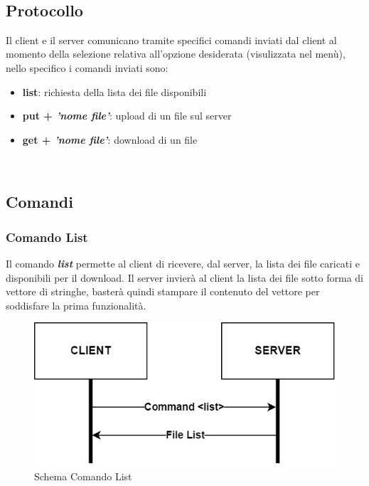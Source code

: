 \documentclass{article}
\begin{document}
\ \\

\subsection{Protocollo}

Il client e il server comunicano tramite specifici comandi inviati dal client al momento della selezione relativa all'opzione desiderata (visulizzata nel menù), nello specifico i comandi inviati sono:
\begin{itemize}
    \item \textbf{list}: richiesta della lista dei file disponibili
    \item \textbf{put + \textit{'nome file'}}: upload di un file sul server
    \item \textbf{get + \textit{'nome file'}}: download di un file
\end{itemize}

\ \\

\subsection{Comandi}
\subsubsection{Comando List}


Il comando \textbf{\emph{list}} permette al client di ricevere, dal server, la lista dei file caricati e disponibili per il download.
Il server invierà al client la lista dei file sotto forma di vettore di stringhe, basterà quindi stampare il contenuto del vettore per soddisfare la prima funzionalità.

\begin{figure}[!htb]
  \includegraphics[width=\linewidth]{commandList.png}
  \caption{Schema Comando List}
\end{figure}
\end{document}
